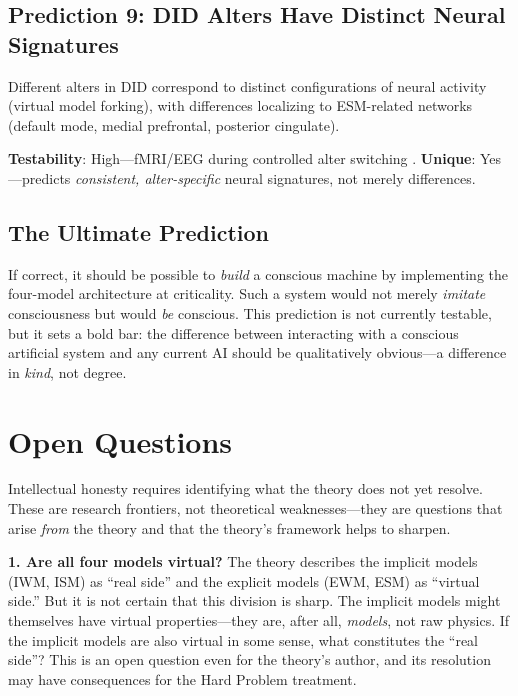 \documentclass[12pt]{article}
\begin{document}
\subsection{Prediction 9: DID Alters Have Distinct Neural Signatures}

Different alters in DID correspond to distinct configurations of neural activity (virtual model forking), with differences localizing to ESM-related networks (default mode, medial prefrontal, posterior cingulate).

\textbf{Testability}: High---\hspace{0pt}fMRI/EEG during controlled alter switching \citep{Reinders2003,Reinders2008}. \textbf{Unique}: Yes---\hspace{0pt}predicts \emph{consistent, alter-specific} neural signatures, not merely differences.


\subsection{The Ultimate Prediction}

If correct, it should be possible to \emph{build} a conscious machine by implementing the four-model architecture at criticality. Such a system would not merely \emph{imitate} consciousness but would \emph{be} conscious. This prediction is not currently testable, but it sets a bold bar: the difference between interacting with a conscious artificial system and any current AI should be qualitatively obvious---\hspace{0pt}a difference in \emph{kind}, not degree.



\section{Open Questions}

Intellectual honesty requires identifying what the theory does not yet resolve. These are research frontiers, not theoretical weaknesses---\hspace{0pt}they are questions that arise \emph{from} the theory and that the theory's framework helps to sharpen.

\textbf{1. Are all four models virtual?} The theory describes the implicit models (IWM, ISM) as ``real side'' and the explicit models (EWM, ESM) as ``virtual side.'' But it is not certain that this division is sharp. The implicit models might themselves have virtual properties---\hspace{0pt}they are, after all, \emph{models}, not raw physics. If the implicit models are also virtual in some sense, what constitutes the ``real side''? This is an open question even for the theory's author, and its resolution may have consequences for the Hard Problem treatment.
\end{document}
